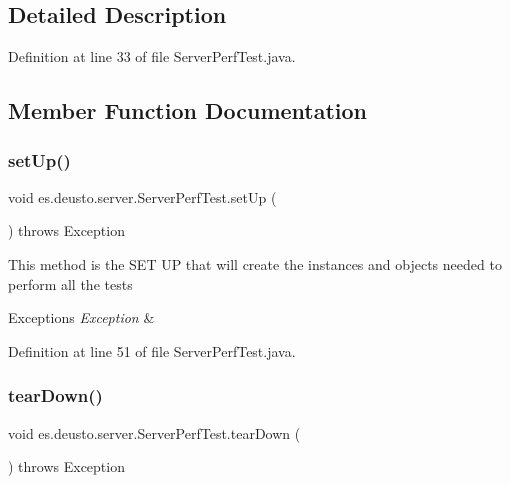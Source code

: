 \subsection{Detailed Description}


Definition at line 33 of file Server\+Perf\+Test.\+java.



\subsection{Member Function Documentation}
\mbox{\label{classes_1_1deusto_1_1server_1_1_server_perf_test_a4e78c4f805d8f61c1f23f55dc5b9fe00}} 
\subsubsection{\texorpdfstring{set\+Up()}{setUp()}}
{\footnotesize\ttfamily void es.\+deusto.\+server.\+Server\+Perf\+Test.\+set\+Up (\begin{DoxyParamCaption}{ }\end{DoxyParamCaption}) throws Exception}

This method is the S\+ET UP that will create the instances and objects needed to perform all the tests 
\begin{DoxyExceptions}{Exceptions}
{\em Exception} & \\
\hline
\end{DoxyExceptions}


Definition at line 51 of file Server\+Perf\+Test.\+java.

\mbox{\label{classes_1_1deusto_1_1server_1_1_server_perf_test_a81109436602a11e6c7b5221d4b004f9b}} 
\subsubsection{\texorpdfstring{tear\+Down()}{tearDown()}}
{\footnotesize\ttfamily void es.\+deusto.\+server.\+Server\+Perf\+Test.\+tear\+Down (\begin{DoxyParamCaption}{ }\end{DoxyParamCaption}) throws Exception}



